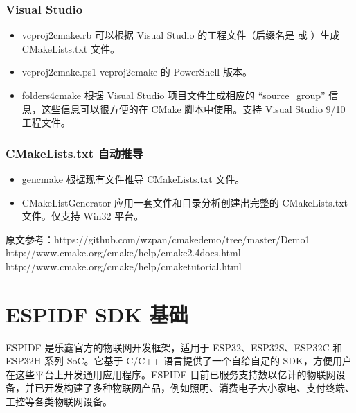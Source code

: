 \documentclass[a4paper,12pt,english]{sphinxmanual}
\begin{document}
\subsubsection{Visual Studio}
\label{\detokenize{dev-board/cmake:visual-studio}}\begin{itemize}
\item {} 
\sphinxAtStartPar
vcproj2cmake.rb 可以根据 Visual Studio 的工程文件（后缀名是  或 ）生成 CMakeLists.txt 文件。

\item {} 
\sphinxAtStartPar
vcproj2cmake.ps1 vcproj2cmake 的 PowerShell 版本。

\item {} 
\sphinxAtStartPar
folders4cmake 根据 Visual Studio 项目文件生成相应的 “source\_group” 信息，这些信息可以很方便的在 CMake 脚本中使用。支持 Visual Studio 9/10 工程文件。

\end{itemize}


\subsubsection{CMakeLists.txt 自动推导}
\label{\detokenize{dev-board/cmake:id17}}\begin{itemize}
\item {} 
\sphinxAtStartPar
gencmake 根据现有文件推导 CMakeLists.txt 文件。

\item {} 
\sphinxAtStartPar
CMakeListGenerator 应用一套文件和目录分析创建出完整的 CMakeLists.txt 文件。仅支持 Win32 平台。

\end{itemize}

\begin{sphinxVerbatim}[commandchars=\\\{\}]
原文参考：https://github.com/wzpan/cmake\PYGZhy{}demo/tree/master/Demo1
http://www.cmake.org/cmake/help/cmake2.4docs.html
http://www.cmake.org/cmake/help/cmake\PYGZus{}tutorial.html
\end{sphinxVerbatim}

\sphinxstepscope


\section{ESP\sphinxhyphen{}IDF SDK 基础}
\label{\detokenize{dev-board/esp-idf:esp-idf-sdk}}\label{\detokenize{dev-board/esp-idf::doc}}
\sphinxAtStartPar
ESP\sphinxhyphen{}IDF 是乐鑫官方的物联网开发框架，适用于 ESP32、ESP32\sphinxhyphen{}S、ESP32\sphinxhyphen{}C 和 ESP32\sphinxhyphen{}H 系列 SoC。它基于 C/C++ 语言提供了一个自给自足的 SDK，方便用户在这些平台上开发通用应用程序。ESP\sphinxhyphen{}IDF 目前已服务支持数以亿计的物联网设备，并已开发构建了多种物联网产品，例如照明、消费电子大小家电、支付终端、工控等各类物联网设备。
\end{document}
